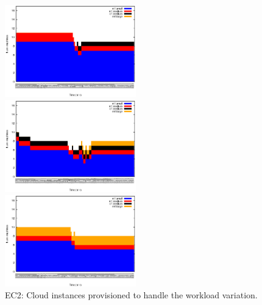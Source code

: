 \begin{figure}[htb]
\vspace{-5mm}
	\begin{minipage}[b]{0.32\linewidth}
		\vspace{-3mm}
		\includegraphics[height=4cm]{images/exps2011/low/ec2/inst_type_machines_filtered.eps}	
	\end{minipage}
	\hfill
	\begin{minipage}[b]{0.32\linewidth}
		\vspace{-3mm}
		\includegraphics[height=4cm]{images/exps2011/medium/ec2/inst_type_machines_filtered.eps}
	\end{minipage}
\hfill
\begin{minipage}[b]{0.32\linewidth}
		\vspace{-3mm}
		\includegraphics[height=4cm]{images/exps2011/high/ec2/inst_type_machines_filtered.eps}
	\end{minipage}
\vspace{-5mm}
\caption{EC2: Cloud instances provisioned to handle the workload variation.}
\label{fig:EC2Instances}
\end{figure}

